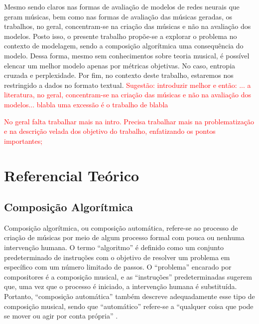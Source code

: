 \documentclass{automatextcc}
\newcommand{\pumi}[1]{\textcolor{red}{#1}}
\begin{document}
Mesmo \citet{olivan2021} sendo claros nas formas de avaliação de modelos de redes neurais que geram músicas, bem como nas formas de avaliação das músicas geradas, os trabalhos, no geral, concentram-se na criação das músicas e não na avaliação dos modelos. Posto isso, o presente trabalho propõe-se a explorar o problema no contexto de modelagem, sendo a composição algorítmica uma consequência do modelo. Dessa forma, mesmo sem conhecimentos sobre teoria musical, é possível elencar um melhor modelo apenas por métricas objetivas. No caso, entropia cruzada e perplexidade. Por fim, no contexto deste trabalho, estaremos nos restringido a dados no formato textual. 
\pumi{Sugestão: introduzir melhor e então: ... a literatura,  no geral, concentram-se na criação das músicas e não na avaliação dos modelos... blabla uma excessão é o trabalho de \citet{olivan2021} blabla }

\pumi{No geral falta trabalhar mais na intro. Precisa trabalhar mais na problematização e na descrição velada dos objetivo do trabalho, enfatizando os pontos importantes; }
\chapter{Referencial Teórico}


\section{Composição Algorítmica}
Composição algorítmica, ou composição automática, refere-se ao processo de criação de músicas por meio de algum processo formal com pouca ou nenhuma intervenção humana. O termo ``algoritmo'' é definido como um conjunto predeterminado de instruções com o objetivo de resolver um problema em específico com um número limitado de passos. O ``problema'' encarado por compositores é a composição musical, e as ``instruções'' predeterminadas sugerem que, uma vez que o processo é iniciado, a intervenção humana é substituída. Portanto, ``composição automática'' também descreve adequadamente esse tipo de composição musical, sendo que ``automático'' refere-se a ``qualquer coisa que pode se mover ou agir por conta própria'' \citep{alpern1995, maurer}.
\end{document}
